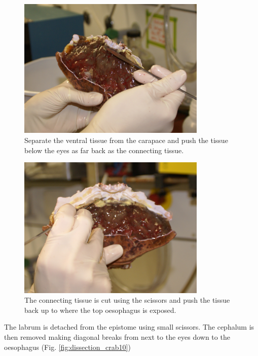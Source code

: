 \begin{figure}[H]
	\begin{center}
		\includegraphics[width=9cm]{graphics/dissection_crab8.png}
		\caption{Separate the ventral tissue from the carapace and push the tissue below the eyes as far back as the connecting tissue.}
		\label{fig:dissection_crab8}
	\end{center}
\end{figure}
\begin{figure}[H]
	\begin{center}
		\includegraphics[width=9cm]{graphics/dissection_crab9.png}
		\caption{The connecting tissue is cut using the scissors and push the tissue back up to where the top oesophagus is exposed.}
		\label{fig:dissection_crab9}
	\end{center}
\end{figure}

The labrum is detached from the epistome using small scissors. The cephalum is then removed making diagonal breaks from next to the eyes down to the oesophagus (Fig. \ref{fig:dissection_crab10})


